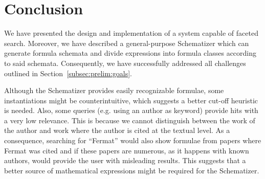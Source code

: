 \documentclass[a4paper,oneside]{article}
\begin{document}
\section{Conclusion}\label{sec:conclusion}
We have presented the design and implementation of a system capable of faceted
search. Moreover, we have described a general-purpose Schematizer which can
generate formula schemata and divide expressions into formula classes according
to said schemata. Consequently, we have successfully addressed all challenges
outlined in Section~\ref{subsec:prelim:goals}.

Although the Schematizer provides easily recognizable formulae, some
instantiations might be counterintuitive, which suggests a better cut-off
heuristic is needed. Also, some queries (e.g. using an author as keyword)
provide hits with a very low relevance.  This is because we cannot distinguish
between the work of the author and work where the author is cited at the
textual level. As a consequence, searching for ``Fermat'' would also show
formulae from papers where Fermat was cited and if these papers are numerous,
as it happens with known authors, would provide the user with misleading
results. This suggests that a better source of mathematical expressions might
be required for the Schematizer.


\printbibliography
\end{document}
